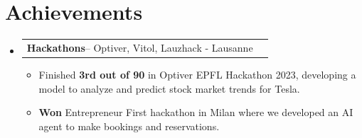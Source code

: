 \documentclass[a4paper,11pt]{article}
\makeatletter
\newcommand{\resumePOR}[3]{
  \vspace{0.5mm}
\item
  \begin{tabular*}{0.97\textwidth}[t]{l@{\extracolsep{\fill}}r}
    \textbf{#1}\hspace{0.3mm}#2 & \textit{\small{#3}}
  \end{tabular*}
  \vspace{-2mm}
}
\newcommand{\resumeSubHeadingListStart}{
\begin{itemize}[leftmargin=*,labelsep=0mm]}
\newcommand{\resumeItemListStart}{
          \begin{justify}
            \begin{itemize}[leftmargin=3ex, rightmargin=2ex,
              noitemsep,labelsep=1.2mm,itemsep=0mm]\small}
\newcommand{\resumeSubHeadingListEnd}{
          \end{itemize}\vspace{2mm}}
\newcommand{\resumeItemListEnd}{
    \end{itemize}
\end{justify}\vspace{-2mm}}
\makeatother
\begin{document}
\section{\textbf{Achievements}}
\vspace{-0.4mm}
\resumeSubHeadingListStart

\resumePOR{Hackathons}
{-- Optiver, Vitol, Lauzhack - Lausanne}
{}
\resumeItemListStart
\item Finished \textbf{3rd out of 90} in Optiver EPFL Hackathon 2023,
developing a model to analyze and predict stock market trends for Tesla.
\item \textbf{Won} Entrepreneur First hackathon in Milan where we developed an
AI agent to make bookings and reservations.
\resumeItemListEnd

\resumeSubHeadingListEnd
\vspace{-5mm}

\end{document}
